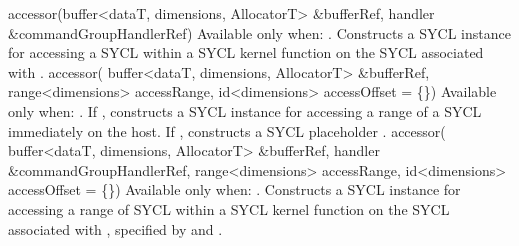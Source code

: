   \addRowTwoL
    { accessor(buffer<dataT, dimensions, AllocatorT> \&bufferRef, }
    { handler \&commandGroupHandlerRef) }
    {
      Available only when: .
      \newline
      Constructs a SYCL  instance for accessing a SYCL
       within a SYCL kernel function on the SYCL
       associated with .
    }
  \addRowThreeL
    { accessor( buffer<dataT, dimensions, AllocatorT> \&bufferRef, }
    { range<dimensions> accessRange, id<dimensions> }
    { accessOffset = \{\}) }
    {
      Available only when: .
      \newline
      If , constructs
      a SYCL  instance for accessing a range of a SYCL
       immediately on the host. If , constructs a SYCL
      placeholder .
    }
  \addRowFourL
    { accessor( buffer<dataT, dimensions, AllocatorT> \&bufferRef, }
    { handler \&commandGroupHandlerRef, }
    { range<dimensions> accessRange, }
    { id<dimensions> accessOffset = \{\}) }
    {
      Available only when: .
      \newline
      Constructs a SYCL  instance for accessing a range of
      SYCL  within a SYCL kernel function on the SYCL
       associated with ,
      specified by  and .
    }
\completeTable

